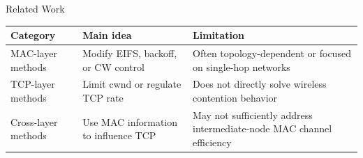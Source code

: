 \begin{frame}{Related Work}

\begin{center}
\small
\begin{tabular}{>{\RaggedRight\arraybackslash}p{} >{\RaggedRight\arraybackslash}p{} >{\RaggedRight\arraybackslash}p{}}
\toprule
\textbf{Category} & \textbf{Main idea} & \textbf{Limitation} \\
\midrule
MAC-layer methods & Modify EIFS, backoff, or CW control & Often topology-dependent or focused on single-hop networks \\
\addlinespace
TCP-layer methods & Limit cwnd or regulate TCP rate & Does not directly solve wireless contention behavior \\
\addlinespace
Cross-layer methods & Use MAC information to influence TCP & May not sufficiently address intermediate-node MAC channel efficiency \\
\bottomrule
\end{tabular}
\end{center}

\vspace{0.25cm}
\end{frame}

